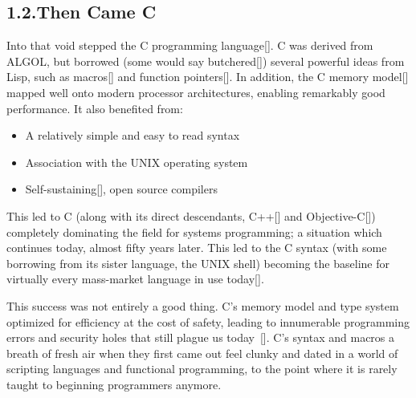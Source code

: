 \documentclass[preprint]{{sigplanconf}}
\begin{document}
\subsection{1.2.\hspace*{0.5em}Then Came C}\label{sec-then-came-c}%

\noindent{}Into that void stepped the C programming language[]. C was derived
from ALGOL, but borrowed (some would say butchered[]) several
powerful ideas from Lisp, such as macros[] and function
pointers[]. In addition, the C memory model[] mapped well onto
modern processor architectures, enabling remarkably good performance. It
also benefited from:%

\begin{itemize}[noitemsep,topsep=\mdcompacttopsep]%

\item{}A relatively simple and easy to read syntax%

\item{}Association with the UNIX operating system%

\item{}Self-sustaining[], open source compilers%
\end{itemize}%

\noindent{}This led to C (along with its direct descendants, C++[] and
Objective-C[]) completely dominating the field for systems
programming; a situation which continues today, almost fifty years later.
This led to the C syntax (with some borrowing from its sister language,
the UNIX shell) becoming the baseline for virtually every mass-market
language in use today[].%

This success was not entirely a good thing. C's memory model and type
system optimized for efficiency at the cost of safety, leading to
innumerable programming errors and security holes that still plague us
today~{}[]. C's syntax and macros \textendash{}  a breath of fresh air
when they first came out \textendash{} feel clunky and dated in a world of scripting
languages and functional programming, to the point where it is rarely
taught to beginning programmers anymore.%
\end{document}
